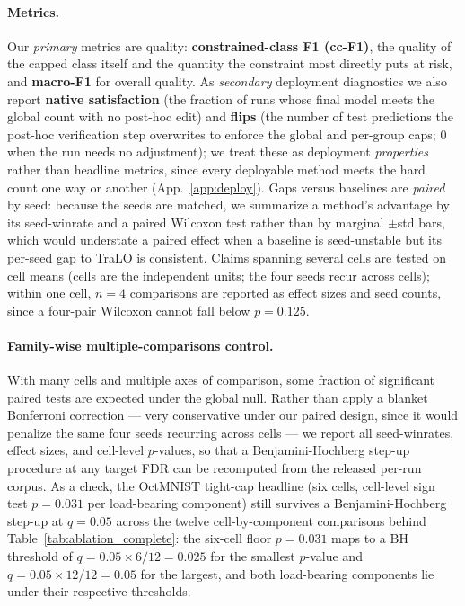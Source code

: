 \documentclass[10pt]{article}
\begin{document}
\paragraph{Metrics.}
Our \emph{primary} metrics are quality: \textbf{constrained-class F1
(cc-F1)}, the quality of the capped class itself and the quantity the
constraint most directly puts at risk, and \textbf{macro-F1} for overall
quality. As \emph{secondary} deployment diagnostics we also report
\textbf{native satisfaction} (the fraction of runs whose final model meets
the global count with no post-hoc edit) and \textbf{flips} (the number of
test predictions the post-hoc verification step overwrites to enforce the
global and per-group caps; $0$ when the run needs no adjustment); we treat
these as deployment \emph{properties} rather than headline metrics, since
every deployable method meets the hard count one way or another
(App.~\ref{app:deploy}). Gaps versus baselines are \emph{paired} by seed:
because the seeds are matched, we summarize a method's advantage by its
seed-winrate and a paired Wilcoxon test rather than by marginal $\pm$std
bars, which would understate a paired effect when a baseline is
seed-unstable but its per-seed gap to TraLO is consistent. Claims spanning
several cells are tested on cell means (cells are the independent units;
the four seeds recur across cells); within one cell, $n{=}4$ comparisons
are reported as effect sizes and seed counts, since a four-pair Wilcoxon
cannot fall below $p{=}0.125$.

\paragraph{Family-wise multiple-comparisons control.}
With many cells and multiple axes of comparison, some fraction of significant
paired tests are expected under the global null. Rather than apply a blanket
Bonferroni correction --- very conservative under our paired design, since it
would penalize the same four seeds recurring across cells --- we report all
seed-winrates, effect sizes, and cell-level $p$-values, so that a
Benjamini-Hochberg step-up procedure at any target FDR can be recomputed from
the released per-run corpus. As a check, the OctMNIST tight-cap headline
(six cells, cell-level sign test $p\!=\!0.031$ per load-bearing component)
still survives a Benjamini-Hochberg step-up at $q\!=\!0.05$ across the twelve
cell-by-component comparisons behind Table~\ref{tab:ablation_complete}: the
six-cell floor $p\!=\!0.031$ maps to a BH threshold of $q\!=\!0.05\times
6/12 = 0.025$ for the smallest $p$-value and $q\!=\!0.05\times 12/12 = 0.05$
for the largest, and both load-bearing components lie under their respective
thresholds.
\end{document}
